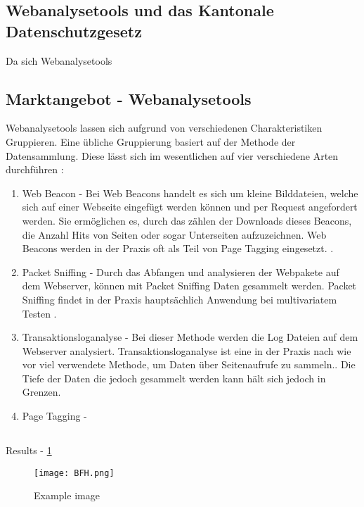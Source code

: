 \subsection{Webanalysetools und das Kantonale Datenschutzgesetz}
Da sich Webanalysetools 
\subsection{}

\subsection{Marktangebot - Webanalysetools}

Webanalysetools lassen sich aufgrund von verschiedenen Charakteristiken Gruppieren.
Eine übliche Gruppierung basiert auf der Methode der Datensammlung. Diese lässt sich im wesentlichen auf vier verschiedene Arten durchführen \parencite{nakatani2011toolselectionmethod}:

\begin{enumerate}
    \item Web Beacon - Bei Web Beacons handelt es sich um kleine Bilddateien, welche sich auf einer Webseite eingefügt werden können und per Request angefordert werden. Sie ermöglichen es, durch das zählen der Downloads dieses Beacons, die Anzahl Hits von Seiten oder sogar Unterseiten aufzuzeichnen. Web Beacons werden in der Praxis oft als Teil von Page Tagging eingesetzt. \parencite[S. 173]{nakatani2011toolselectionmethod}.
    \item Packet Sniffing - Durch das Abfangen und analysieren der Webpakete auf dem Webserver, können mit Packet Sniffing Daten gesammelt werden. Packet Sniffing findet in der Praxis hauptsächlich Anwendung bei multivariatem Testen \parencite[S. 4]{waisberg2009webShort}.
    \item Transaktionsloganalyse - Bei dieser Methode werden die Log Dateien auf dem Webserver analysiert. Transaktionsloganalyse ist eine in der Praxis nach wie vor viel verwendete Methode, um Daten über Seitenaufrufe zu sammeln.\parencite[S. 173]{nakatani2011toolselectionmethod}. Die Tiefe der Daten die jedoch gesammelt werden kann hält sich jedoch in Grenzen. 
    \item Page Tagging - \parencite[S. 173]{nakatani2011toolselectionmethod}
  \end{enumerate}

\subsection{}
\subsection{}
\subsection{}
\subsection{}


Results - \ref{fig: a black image}

\begin{figure}[h]
    \centering
    \texttt{[image: BFH.png]}
    \caption{Example image}
    \label{fig: a black image}
\end{figure}
